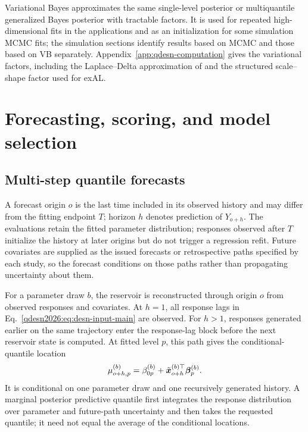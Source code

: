 Variational Bayes approximates the same single-level posterior or
multiquantile generalized Bayes posterior with tractable factors. It is used
for repeated high-dimensional
fits in the applications and as an initialization for some simulation MCMC
fits; the simulation sections identify results based on MCMC and those based
on VB separately. Appendix~\ref{app:qdesn-computation} gives the variational
factors, including the Laplace--Delta approximation of
\citet{exd-wang2013nonconjugatevb} and the structured scale--shape factor used
for exAL.


\section{Forecasting, scoring, and model selection}
\label{qdesn2026:sec:forecast}

\subsection{Multi-step quantile forecasts}

A forecast origin \(o\) is the last time included in its observed history
and may differ from the fitting endpoint \(T\); horizon \(h\) denotes
prediction of \(Y_{o+h}\). The evaluations retain the fitted parameter
distribution; responses observed after \(T\) initialize the history at later
origins but do not trigger a regression refit. Future covariates are supplied
as the issued forecasts or retrospective paths specified by each study, so
the forecast conditions on those paths rather than propagating uncertainty
about them.

For a parameter draw \(b\), the reservoir is reconstructed through origin
\(o\) from observed responses and covariates. At \(h=1\), all response lags in
Eq.~\eqref{qdesn2026:eq:desn-input-main} are observed. For \(h>1\), responses
generated earlier on the same trajectory enter the response-lag block before
the next reservoir state is computed. At fitted level \(p\), this path gives
the conditional-quantile location
\[
\mu_{o+h,p}^{(b)}=\beta_{0p}^{(b)}
+\tilde{\boldsymbol{x}}_{o+h}^{(b)\top}\boldsymbol{\beta}_p^{(b)}.
\]
It is conditional on one parameter draw and one recursively generated history.
A marginal posterior predictive quantile first integrates the response distribution
over parameter and future-path uncertainty and then takes the requested
quantile; it need not equal the average of the conditional locations.

